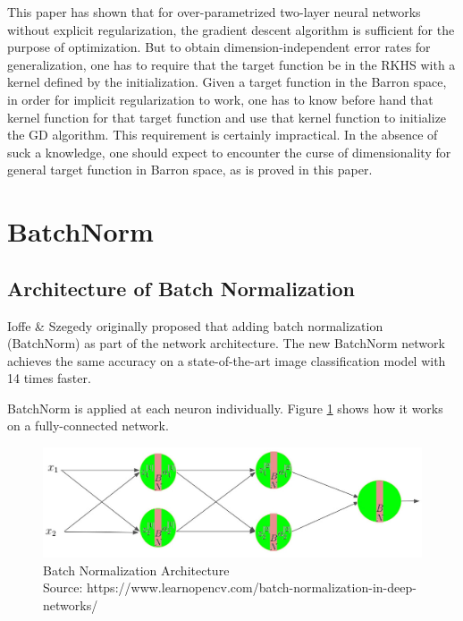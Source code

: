 \documentclass{article}
\begin{document}
This paper has shown that for over-parametrized two-layer neural networks without explicit regularization, the gradient descent algorithm is sufficient for the purpose of optimization. But to obtain dimension-independent error rates for generalization, one has to require that the target function be in the RKHS with a kernel defined by the initialization. Given a target function in the Barron space, in order for implicit regularization to work, one has to know before hand that kernel function for that target function and use that kernel function to initialize the GD algorithm. This requirement is certainly impractical. In the absence of suck a knowledge, one should expect to encounter the curse of dimensionality for general target function in Barron space, as is proved in this paper. 

\section{BatchNorm}
\label{label:BatchNorm}

\subsection{Architecture of Batch Normalization}


Ioffe \& Szegedy \cite{batchnorm} originally proposed that adding batch normalization (BatchNorm) as part of the network architecture. The new BatchNorm network achieves the same accuracy on a state-of-the-art image classification model with 14 times faster.

BatchNorm is applied at each neuron individually. Figure \ref{fig:batchnorm} shows how it works on a fully-connected network. 


\begin{figure}[h]
	\centering
    \includegraphics[width=\textwidth]{pics/batchNorm/batch-normalization.jpg}
	\caption{Batch Normalization Architecture\\Source: https://www.learnopencv.com/batch-normalization-in-deep-networks/}
	\label{fig:batchnorm}
\end{figure}
\end{document}
